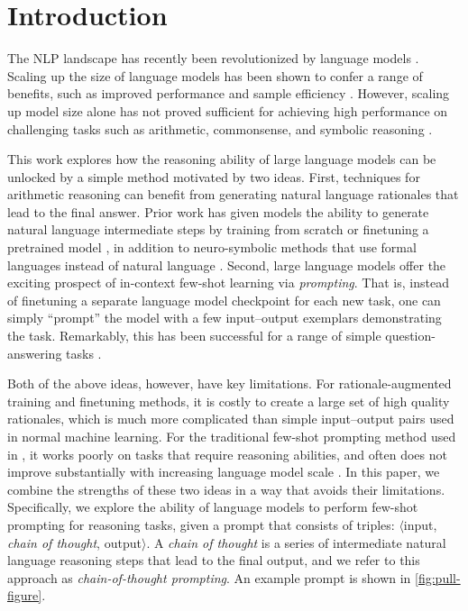 \documentclass[]{article}
\theoremstyle{plain}
\theoremstyle{definition}
\theoremstyle{remark}
\begin{document}
\section{Introduction}
The NLP landscape has recently been revolutionized by language models \citep[][\textit{inter alia}]{peters-etal-2018-deep,devlin-etal-2019-bert,brown2020language}.
Scaling up the size of language models has been shown to confer a range of benefits, such as improved performance and sample efficiency  \citep[\textit{inter alia}]{kaplan2020scaling,brown2020language}.
However, scaling up model size alone has not proved sufficient for achieving high performance on challenging tasks such as arithmetic, commonsense, and symbolic reasoning \citep{rae2021scaling}.




This work explores how the reasoning ability of large language models can be unlocked by a simple method motivated by two ideas. %
First, techniques for arithmetic reasoning can benefit from generating natural language rationales that lead to the final answer.
Prior work has given models the ability to generate natural language intermediate steps by training from scratch \citep{ling-etal-2017-program} or finetuning a pretrained model \citep{cobbe2021training}, in addition to neuro-symbolic methods that use formal languages instead of natural language \citep{roy-roth-2015-solving, chiang-chen-2019-semantically,amini-etal-2019-mathqa, chen2019neural}.
Second, large language models offer the exciting prospect of in-context few-shot learning via \emph{prompting}.
That is, instead of finetuning a separate language model checkpoint for each new task, one can simply ``prompt'' the model with a few input--output exemplars demonstrating the task.
Remarkably, this has been successful for a range of simple question-answering tasks \citep{brown2020language}.

Both of the above ideas, however, have key limitations. For rationale-augmented training and finetuning methods, it is costly to create a large set of high quality rationales, which is much more complicated than simple input--output pairs used in normal machine learning. 
For the traditional few-shot prompting method used in \citet{brown2020language}, it works poorly on tasks that require reasoning abilities, and often does not improve substantially with increasing language model scale \citep{rae2021scaling}. 
In this paper, we combine the strengths of these two ideas in a way that avoids their limitations. Specifically, we explore the ability of language models to perform few-shot prompting for reasoning tasks, given a prompt that consists of triples: $\langle$input, \emph{chain of thought}, output$\rangle$.
A \emph{chain of thought} is a series of intermediate natural language reasoning steps that lead to the final output, and we refer to this approach as \textit{chain-of-thought prompting}. An example prompt is shown in \cref{fig:pull-figure}. %
\end{document}

